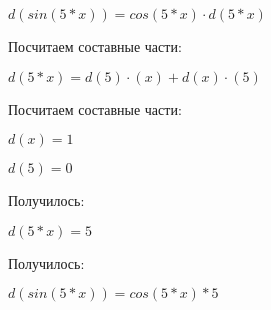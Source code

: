 $ d(sin(5*x)) = cos(5*x) \cdot d(5*x)$

Посчитаем составные части:

$ d(5*x) = d(5) \cdot (x) + d(x) \cdot (5)$

Посчитаем составные части:

$ d(x) = 1$

$ d(5) = 0$

Получилось:

$ d(5*x) = 5$

Получилось:

$ d(sin(5*x)) = cos(5*x)*5$

